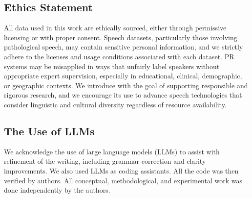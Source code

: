 \subsection*{Ethics Statement}
All data used in this work are ethically sourced, either through permissive licensing or with proper consent. 
Speech datasets, particularly those involving pathological speech, may contain sensitive personal information, and we strictly adhere to the licenses and usage conditions associated with each dataset.
PR systems may be misapplied in ways that unfairly label speakers without appropriate expert supervision, especially in educational, clinical, demographic, or geographic contexts.
We introduce \bench with the goal of supporting responsible and rigorous research, and we encourage its use to advance speech technologies that consider linguistic and cultural diversity regardless of resource availability.

\subsection*{The Use of LLMs}
We acknowledge the use of large language models (LLMs) to assist with refinement of the writing, including grammar correction and clarity improvements.
We also used LLMs as coding assistants.
All the code was then verified by authors.
All conceptual, methodological, and experimental work was done independently by the authors.